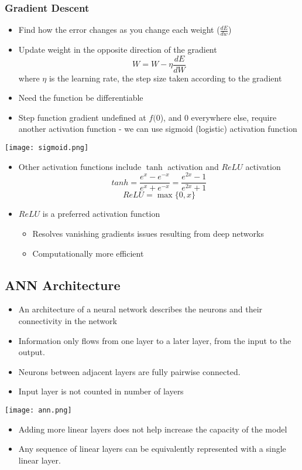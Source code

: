 \documentclass[11pt]{article}
\begin{document}
\subsubsection{Gradient Descent }
\begin{itemize}
\item Find how the error changes as you change each weight ($\frac{dE}{dw}$)
\item Update weight in the opposite direction of the gradient 
$$ W = W - \eta \frac{dE}{dW}$$ 
where $\eta$ is the learning rate,  the step size taken according to the gradient 
\item Need the function be differentiable
\item Step function gradient undefined at $f(0$), and $0$ everywhere else,  require another activation function - we can use sigmoid (logistic) activation function 
\end{itemize}
\begin{center}
\texttt{[image: sigmoid.png]}
\end{center}
\begin{itemize}
\item Other activation functions include $\tanh$ activation and $ReLU$ activation
$$ tanh = \frac{e^x - e^{-x}}{e^x + e^{-x}} = \frac{e^{2x} -  1}{e^{2x} + 1} $$ 
$$ ReLU = \max \{ 0,  x \} $$ 
\item $ReLU$ is a preferred activation function
\begin{itemize}
\item Resolves vanishing gradients issues resulting from deep networks
\item Computationally more efficient
\end{itemize}
\end{itemize}

\subsection{ANN Architecture}
\begin{itemize}
\item An architecture of a neural network describes the neurons and their connectivity in the network
\item Information only flows from one layer to a later layer, from the input to the output.
\item Neurons between adjacent layers are fully pairwise connected.
\item Input layer is not counted in number of layers 
\end{itemize}
\begin{center}
\texttt{[image: ann.png]}
\end{center}
\begin{itemize}
\item Adding more linear layers does not help increase the capacity of the model
\item Any sequence of linear layers can be equivalently represented with a single linear layer.
\end{itemize}
\end{document}
